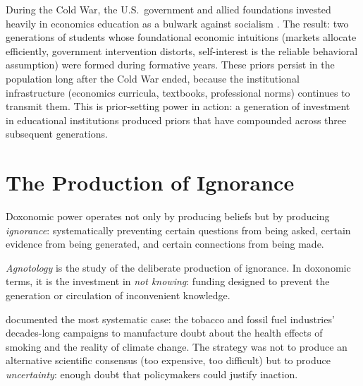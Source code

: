 \begin{example}
\label{ex:cold-war-priors}
During the Cold War, the U.S.\ government and allied foundations invested heavily in economics education as a bulwark against socialism \autocite{mirowski2009}.
The result: two generations of students whose foundational economic intuitions (markets allocate efficiently, government intervention distorts, self-interest is the reliable behavioral assumption) were formed during formative years.
These priors persist in the population long after the Cold War ended, because the institutional infrastructure (economics curricula, textbooks, professional norms) continues to transmit them.
This is prior-setting power in action: a generation of investment in educational institutions produced priors that have compounded across three subsequent generations.
\end{example}


\section{The Production of Ignorance}
\label{sec:ch9-ignorance}

Doxonomic power operates not only by producing beliefs but by producing \emph{ignorance}: systematically preventing certain questions from being asked, certain evidence from being generated, and certain connections from being made.

\begin{definition}[Agnotology]
\label{def:agnotology}
\emph{Agnotology} is the study of the deliberate production of ignorance.
In doxonomic terms, it is the investment in \emph{not knowing}: funding designed to prevent the generation or circulation of inconvenient knowledge.
\end{definition}

\textcite{oreskes2010} documented the most systematic case: the tobacco and fossil fuel industries' decades-long campaigns to manufacture doubt about the health effects of smoking and the reality of climate change.
The strategy was not to produce an alternative scientific consensus (too expensive, too difficult) but to produce \emph{uncertainty}: enough doubt that policymakers could justify inaction.

